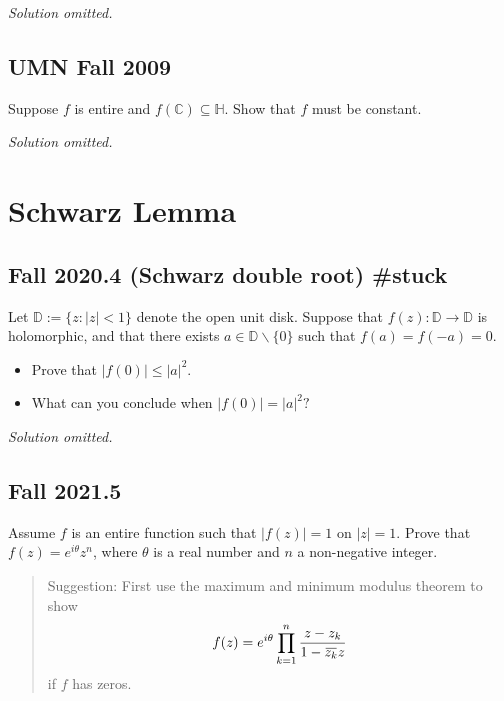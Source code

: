 \emph{Solution omitted.}

\hypertarget{umn-fall-2009}{%
\subsection{UMN Fall 2009}\label{umn-fall-2009}}

\begin{problem}[?]

Suppose \(f\) is entire and \(f({\mathbb{C}}) \subseteq {\mathbb{H}}\).
Show that \(f\) must be constant.

\end{problem}

\emph{Solution omitted.}

\hypertarget{schwarz-lemma}{%
\section{Schwarz Lemma}\label{schwarz-lemma}}

\hypertarget{fall-2020.4-schwarz-double-root-stuck}{%
\subsection{Fall 2020.4 (Schwarz double root)
\#stuck}\label{fall-2020.4-schwarz-double-root-stuck}}

\begin{problem}[?]

Let \(\mathbb{D}:=\{z:|z|<1\}\) denote the open unit disk. Suppose that
\(f(z): \mathbb{D} \rightarrow \mathbb{D}\) is holomorphic, and that
there exists \(a \in \mathbb{D} \backslash\{0\}\) such that
\(f(a)=f(-a)=0\).

\begin{itemize}
\item
  Prove that \(|f(0)| \leq|a|^{2}\).
\item
  What can you conclude when \(|f(0)|=|a|^{2} ?\)
\end{itemize}

\end{problem}

\emph{Solution omitted.}

\hypertarget{fall-2021.5}{%
\subsection{Fall 2021.5}\label{fall-2021.5}}

\begin{problem}[?]

Assume \(f\) is an entire function such that \(|f(z)|=1\) on \(|z|=1\).
Prove that \(f(z)=e^{i \theta} z^{n}\), where \(\theta\) is a real
number and \(n\) a non-negative integer.

\begin{quote}
Suggestion: First use the maximum and minimum modulus theorem to show
\begin{align*}
f(z)=e^{i \theta} \prod_{k=1}^{n} \frac{z-z_{k}}{1-\mkern 1.5mu\overline{\mkern-1.5muz_{k}\mkern-1.5mu}\mkern 1.5mu z}
\end{align*}
if \(f\) has zeros.
\end{quote}

\end{problem}

